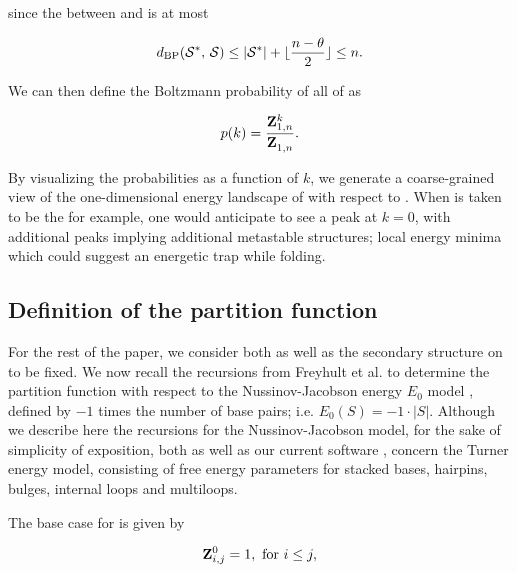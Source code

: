 since the \bpd between \strSt and \str is at most

\begin{align}
\label{eq:fftbor:maxDist}
\dBP{\strSt}{\str} \leq |\strSt| + \lfloor \frac{n-\theta}{2} \rfloor \leq n.
\end{align}

We can then define the Boltzmann probability of all \kNbrs of \strSt as

\begin{align}
\label{eq:fftbor:probK}
p(k) =\frac{\bfZ{k}{1,n}}{\bfZ{}{1,n}}.
\end{align}

By visualizing the probabilities \pk as a function of $k$, we generate a
coarse-grained view of the one-dimensional energy landscape of \seq with
respect to \strSt. When \strSt is taken to be the \mfes for example, one would
anticipate to see a peak at $k=0$, with additional peaks implying additional
metastable structures; local energy minima which could suggest an energetic
trap while folding.

\subsection{Definition of the partition function
\texorpdfstring{}{}}
\label{subsec:fftbor:recursions}

For the rest of the paper, we consider both \seq as well as the
secondary structure \strSt on \seq to be fixed. We now recall the
recursions from Freyhult et al. \citep{Freyhult.ab05} to determine
the partition function  with
respect to the Nussinov-Jacobson
energy $E_0$ model \citep{nussinovjacobson}, defined by
$-1$ times the number of base pairs; i.e. $E_0(S) = -1 \cdot |S|$.
Although we describe here the recursions for the Nussinov-Jacobson
model, for the sake of
simplicity of exposition, both \rnabor
\citep{Freyhult.ab05} as well as our current software \fftbor,
concern the Turner energy model, consisting of free energy parameters for
stacked bases, hairpins, bulges, internal loops and multiloops.


The base case for  is given by

\begin{align}
\label{eq:fftbor:initZpart1}
\bfZ{0}{i,j} = 1, \text{ for } i \le j,
\end{align}

